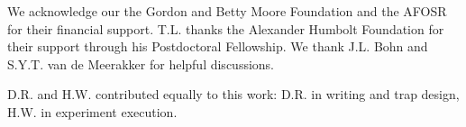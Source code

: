 \documentclass[%
 reprint,
groupedaddress,
 amsmath,amssymb,
 aps,
prl,
]{revtex4-1}
\begin{document}
We acknowledge our the Gordon and Betty Moore Foundation and the AFOSR for their financial support. T.L. thanks the Alexander Humbolt Foundation for their support through his Postdoctoral Fellowship. We thank J.L. Bohn and S.Y.T. van de Meerakker for helpful discussions.

D.R. and H.W. contributed equally to this work: D.R. in writing and trap design, H.W. in experiment execution.


\end{document}
